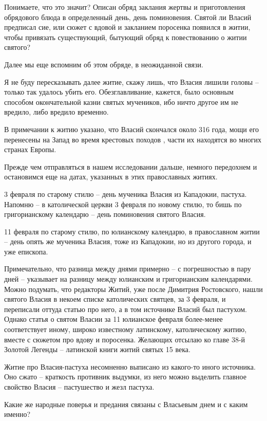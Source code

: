    Понимаете, что это значит? Описан обряд заклания жертвы и приготовления обрядового блюда в определенный день, день поминовения. Святой ли Власий предписал сие, или сюжет с вдовой и закланием поросенка появился в житии, чтобы привязать существующий, бытующий обряд к повествованию о житии святого?

   Далее мы еще вспомним об этом обряде, в неожиданной связи.

   Я не буду пересказывать далее житие, скажу лишь, что Власия лишили головы – только так удалось убить его. Обезглавливание, кажется, было основным способом окончательной казни святых мучеников, ибо ничто другое им не вредило, либо вредило временно.

   В примечании к житию указано, что Власий скончался около 316 года, мощи его перенесены на Запад во время крестовых походов , части их находятся во многих странах Европы.

   Прежде чем отправляться в нашем исследовании дальше, немного передохнем и остановимся еще на датах, указанных в этих православных житиях.

   3 февраля по старому стилю – день мученика Власия из Кападокии, пастуха. Напомню – в католической церкви 3 февраля по новому стилю, то бишь по григорианскому календарю – день поминовения святого Власия.

   11 февраля по старому стилю, по юлианскому календарю, в православном житии – день опять же мученика Власия, тоже из Кападокии, но из другого города, и уже епископа.

   Примечательно, что разница между днями примерно – с погрешностью в пару дней – указывает на разницу между юлианским и григорианским календарями. Можно подумать, что редакторы Житий, уже после Димитрия Ростовского, нашли святого Власия в некоем списке католических святцев, за 3 февраля, и переписали оттуда статью про него, а в том источнике Власий был пастухом. Однако статья о святом Власии за 11 юлианское февраля более-менее соответствует иному, широко известному латинскому, католическому житию, вместе с сюжетом про вдову и поросенка. Желающих отсылаю ко главе 38-й Золотой Легенды – латинской книги житий святых 15 века.

    Житие про Власия-пастуха несомненно выписано из какого-то иного источника. Оно сжато – краткость противник выдумки, из него можно выделить главное свойство Власия – пастушество и жезл пастуха.

   Какие же народные поверья и предания связаны с Власьевым днем и с каким именно?

